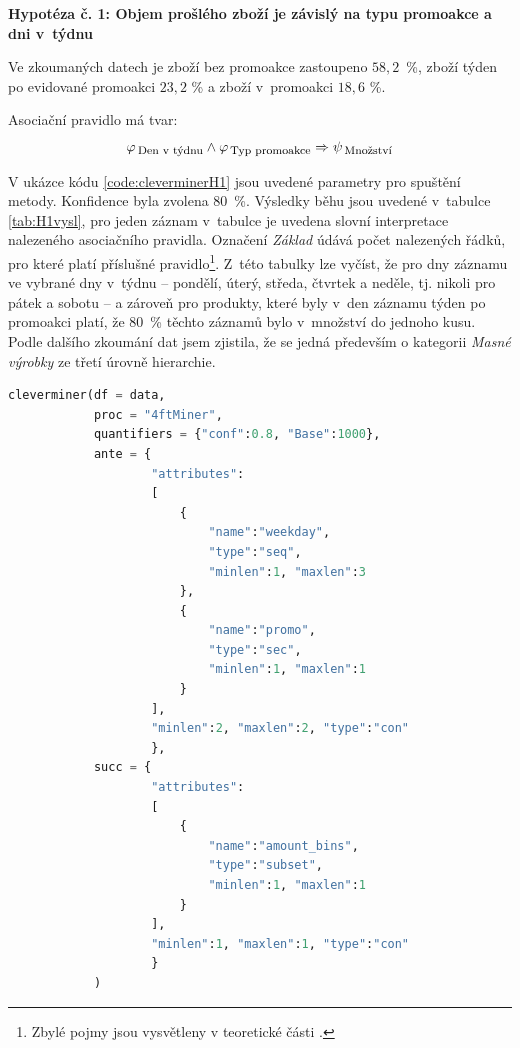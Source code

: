 \textbf{Hypotéza č. 1: Objem prošlého zboží je závislý na typu promoakce a dni v~týdnu}

Ve zkoumaných datech je zboží bez promoakce zastoupeno $58{,}2$~\%, zboží týden po evidované promoakci $23{,}2$ \% a zboží v~promoakci $18{,}6$ \%. 

Asociační pravidlo má tvar:
\begin{equation}
    \varphi_{\mbox{\,\footnotesize Den v~týdnu}} \land \varphi_{\,\mbox{\footnotesize Typ promoakce}} \Rightarrow \psi_{\mbox{\,\footnotesize Množství}}
\end{equation}

V ukázce kódu \ref*{code:cleverminerH1} jsou uvedené parametry pro spuštění metody. Konfidence byla zvolena 80~\%. Výsledky běhu jsou uvedené v~tabulce \ref*{tab:H1vysl}, pro jeden záznam v~tabulce je uvedena slovní interpretace nalezeného asociačního pravidla. Označení \emph{Základ} údává počet nalezených řádků, pro které platí příslušné pravidlo\footnote{Zbylé pojmy jsou vysvětleny v teoretické části \label{sec:clever:pojmy}.}.  Z~této tabulky lze vyčíst, že pro dny záznamu ve vybrané dny v~týdnu -- pondělí, úterý, středa, čtvrtek a neděle, tj. nikoli pro pátek a sobotu -- a zároveň pro produkty, které byly v~den záznamu týden po promoakci platí, že 80~\% těchto záznamů bylo v~množství do jednoho kusu. Podle dalšího zkoumání dat jsem zjistila, že se jedná především o kategorii \emph{Masné výrobky} ze třetí úrovně hierarchie.


\begin{lstlisting}[language=Python, style=mystyle, label={code:cleverminerH1}, caption={Hypotéza č. 1, funkce \texttt{cleverminer}.}]
cleverminer(df = data,
            proc = "4ftMiner", 
            quantifiers = {"conf":0.8, "Base":1000},
            ante = {
                    "attributes":
                    [
                        {
                            "name":"weekday", 
                            "type":"seq", 
                            "minlen":1, "maxlen":3
                        },
                        {
                            "name":"promo", 
                            "type":"sec", 
                            "minlen":1, "maxlen":1
                        }
                    ], 
                    "minlen":2, "maxlen":2, "type":"con"
                    },
            succ = {
                    "attributes":
                    [
                        {
                            "name":"amount_bins", 
                            "type":"subset", 
                            "minlen":1, "maxlen":1
                        }
                    ], 
                    "minlen":1, "maxlen":1, "type":"con"
                    }
            )
    \end{lstlisting}

